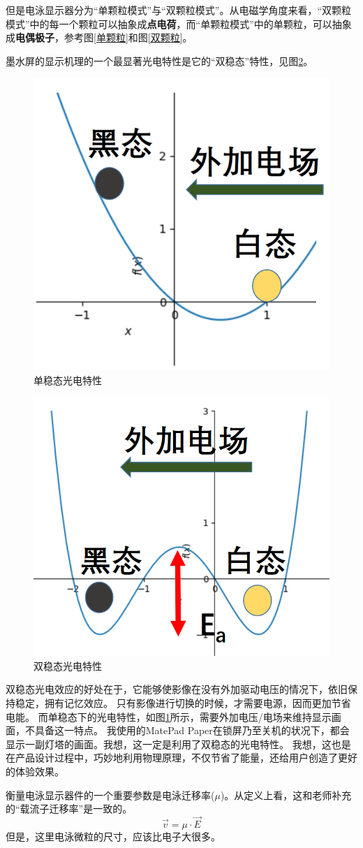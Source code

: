 \documentclass[UTF-8]{ctexart}
\begin{document}
但是电泳显示器分为“单颗粒模式”与“双颗粒模式”。从电磁学角度来看，“双颗粒模式”中的每一个颗粒可以抽象成\textbf{点电荷}，而“单颗粒模式”中的单颗粒，可以抽象成\textbf{电偶极子}，参考图\ref{单颗粒}和图\ref{双颗粒}。

墨水屏的显示机理的一个最显著光电特性是它的“双稳态”特性，见图\ref{双稳态}。
\begin{figure}
    \centering
    \includegraphics[width=0.4\linewidth]{../Figures/monostable.png}
    \caption{单稳态光电特性}
    \label{单稳态}
\end{figure}
\begin{figure}
    \centering
    \includegraphics[width=0.6\linewidth]{../Figures/bistable.png}
    \caption{双稳态光电特性}
    \label{双稳态}
\end{figure}
双稳态光电效应的好处在于，它能够使影像在没有外加驱动电压的情况下，依旧保持稳定，拥有记忆效应。
只有影像进行切换的时候，才需要电源，因而更加节省电能。
而单稳态下的光电特性，如图\ref{单稳态}所示，需要外加电压/电场来维持显示画面，不具备这一特点。
我使用的MatePad Paper在锁屏乃至关机的状况下，都会显示一副灯塔的画面。我想，这一定是利用了双稳态的光电特性。
我想，这也是在产品设计过程中，巧妙地利用物理原理，不仅节省了能量，还给用户创造了更好的体验效果。


衡量电泳显示器件的一个重要参数是电泳迁移率($\mu$)。从定义上看，这和老师补充的“载流子迁移率”是一致的。
$$
\vec{v}=\mu \cdot \vec{E}
$$
但是，这里电泳微粒的尺寸，应该比电子大很多。
\end{document}
